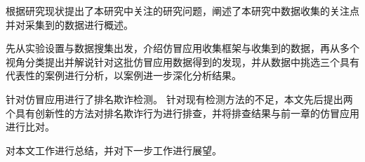  根据研究现状提出了本研究中关注的研究问题，阐述了本研究中数据收集的关注点并对采集到的数据进行概述。

 先从实验设置与数据搜集出发，介绍仿冒应用收集框架\mytool 与收集到的数据，再从多个视角分类提出并解说针对这批仿冒应用数据得到的发现，并从数据中挑选三个具有代表性的案例进行分析，以案例进一步深化分析结果。

 针对仿冒应用进行了排名欺诈检测。
针对现有检测方法的不足，本文先后提出两个具有创新性的方法对排名欺诈行为进行排查，并将排查结果与前一章的仿冒应用进行比对。

 对本文工作进行总结，并对下一步工作进行展望。
